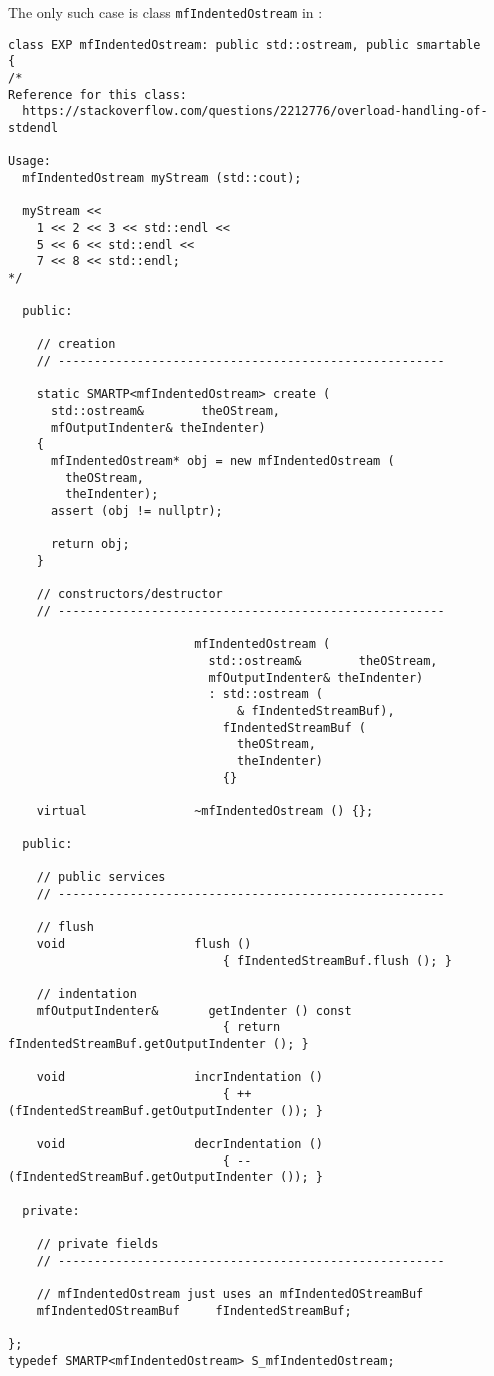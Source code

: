 The only such case is class   {\tt mfIndentedOstream} in :
\begin{lstlisting}[language=CPlusPlus]
class EXP mfIndentedOstream: public std::ostream, public smartable
{
/*
Reference for this class:
  https://stackoverflow.com/questions/2212776/overload-handling-of-stdendl

Usage:
  mfIndentedOstream myStream (std::cout);

  myStream <<
    1 << 2 << 3 << std::endl <<
    5 << 6 << std::endl <<
    7 << 8 << std::endl;
*/

  public:

    // creation
    // ------------------------------------------------------

    static SMARTP<mfIndentedOstream> create (
      std::ostream&        theOStream,
      mfOutputIndenter& theIndenter)
    {
      mfIndentedOstream* obj = new mfIndentedOstream (
        theOStream,
        theIndenter);
      assert (obj != nullptr);

      return obj;
    }

    // constructors/destructor
    // ------------------------------------------------------

                          mfIndentedOstream (
                            std::ostream&        theOStream,
                            mfOutputIndenter& theIndenter)
                            : std::ostream (
                                & fIndentedStreamBuf),
                              fIndentedStreamBuf (
                                theOStream,
                                theIndenter)
                              {}

    virtual               ~mfIndentedOstream () {};

  public:

    // public services
    // ------------------------------------------------------

    // flush
    void                  flush ()
                              { fIndentedStreamBuf.flush (); }

    // indentation
    mfOutputIndenter&       getIndenter () const
                              { return fIndentedStreamBuf.getOutputIndenter (); }

    void                  incrIndentation ()
                              { ++ (fIndentedStreamBuf.getOutputIndenter ()); }

    void                  decrIndentation ()
                              { -- (fIndentedStreamBuf.getOutputIndenter ()); }

  private:

    // private fields
    // ------------------------------------------------------

    // mfIndentedOstream just uses an mfIndentedOStreamBuf
    mfIndentedOStreamBuf     fIndentedStreamBuf;

};
typedef SMARTP<mfIndentedOstream> S_mfIndentedOstream;
\end{lstlisting}


